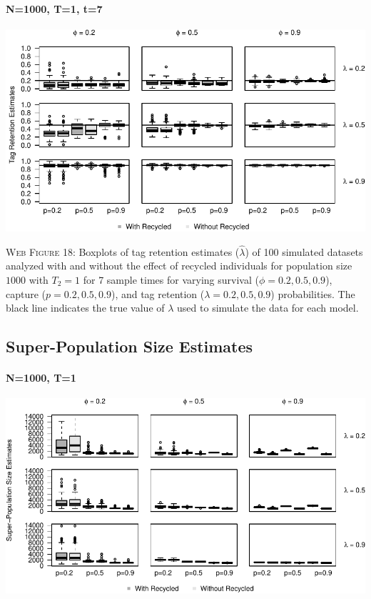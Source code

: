 \documentclass[]{article}
\let\oldparagraph\paragraph
\renewcommand{\paragraph}[1]{\oldparagraph{#1}\mbox{}}
\begin{document}
\paragraph{N=1000, T=1, t=7}\label{n1000-t1-t7-2}

\includegraphics{Appendix_BW_files/figure-latex/figure18_tagretention_GJSTL6-1.pdf}

\textsc{Web Figure 18:} Boxplots of tag retention estimates
(\(\hat{\lambda}\)) of 100 simulated datasets analyzed with and without
the effect of recycled individuals for population size \(1000\) with
\(T_2=1\) for 7 sample times for varying survival
(\(\phi=0.2,0.5,0.9\)), capture (\(p=0.2,0.5,0.9\)), and tag retention
(\(\lambda=0.2,0.5,0.9\)) probabilities. The black line indicates the
true value of \(\lambda\) used to simulate the data for each model.

\newpage

\subsection{Super-Population Size
Estimates}\label{super-population-size-estimates}

\paragraph{N=1000, T=1}\label{n1000-t1-3}

\includegraphics{Appendix_BW_files/figure-latex/figure19_superN_GJSTL1-1.pdf}
\end{document}
